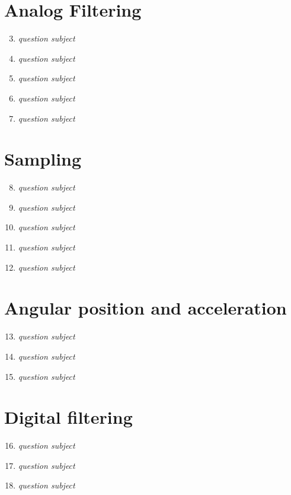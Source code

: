 \documentclass[a4paper,12pt]{article}
\begin{document}
\section{Analog Filtering}
\begin{enumerate}[label={\color{blue}\arabic*)}]
  \setcounter{enumi}{2}
  \item \emph{question subject}
  \item \emph{question subject}
  \item \emph{question subject}
  \item \emph{question subject}
  \item \emph{question subject}
\end{enumerate}

\section{Sampling}
\begin{enumerate}[label={\color{blue}\arabic*)}]
  \setcounter{enumi}{7}
  \item \emph{question subject}
  \item \emph{question subject}
  \item \emph{question subject}
  \item \emph{question subject}
  \item \emph{question subject}
\end{enumerate}

\section{Angular position and acceleration}
\begin{enumerate}[label={\color{blue}\arabic*)}]
  \setcounter{enumi}{12}
  \item \emph{question subject}
  \item \emph{question subject}
  \item \emph{question subject}
\end{enumerate}

\section{Digital filtering}
\begin{enumerate}[label={\color{blue}\arabic*)}]
  \setcounter{enumi}{15}
  \item \emph{question subject}
  \item \emph{question subject}
  \item \emph{question subject}
\end{enumerate}
\end{document}
